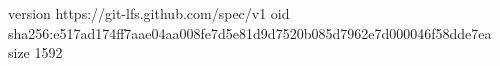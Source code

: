 version https://git-lfs.github.com/spec/v1
oid sha256:e517ad174ff7aae04aa008fe7d5e81d9d7520b085d7962e7d000046f58dde7ea
size 1592
